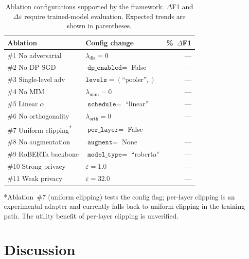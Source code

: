 \documentclass{article}
\begin{document}
\begin{table}[h]
  \centering
  \caption{Ablation configurations supported by the framework.
           $\Delta$F1 and $\Delta\varepsilon$ require trained-model
           evaluation. Expected trends are shown in parentheses.}
  \label{tab:ablations}
  \begin{tabular}{llr}
    \toprule
    \textbf{Ablation} & \textbf{Config change} & \%~\textbf{$\Delta$F1} \\
    \midrule
    \#1 No adversarial & $\lambda_{\text{dis}} = 0$ & --- \\
    \#2 No DP-SGD & $\texttt{dp\_enabled}=$ False & --- \\
    \#3 Single-level adv & $\texttt{levels}=(\text{``pooler''},)$ & --- \\
    \#4 No MIM & $\lambda_{\text{mim}} = 0$ & --- \\
    \#5 Linear $\alpha$ & $\texttt{schedule}=$ ``linear'' & --- \\
    \#6 No orthogonality & $\lambda_{\text{orth}} = 0$ & --- \\
    \#7 Uniform clipping\textsuperscript{*} & $\texttt{per\_layer}=$ False & --- \\
    \#8 No augmentation & $\texttt{augment}=$ None & --- \\
    \#9 RoBERTa backbone & $\texttt{model\_type}=$ ``roberta'' & --- \\
    \#10 Strong privacy & $\varepsilon=1.0$ & --- \\
    \#11 Weak privacy & $\varepsilon=32.0$ & --- \\
    \bottomrule
  \end{tabular}

  \vspace{2mm}
  \raggedright\footnotesize
  *Ablation~\#7 (uniform clipping) tests the config flag; per-layer clipping
  is an experimental adapter and currently falls back to uniform clipping
  in the training path. The utility benefit of per-layer clipping is
  unverified.
\end{table}


\section{Discussion}
\label{sec:discussion}
\end{document}
